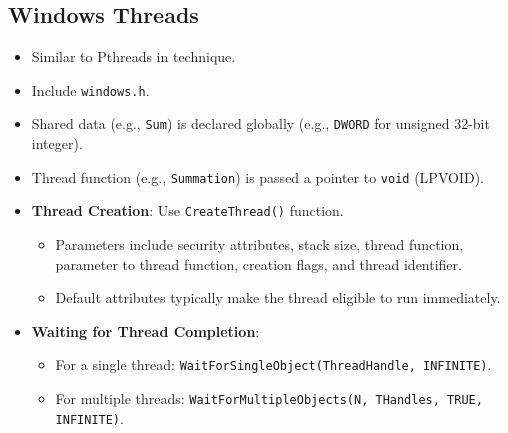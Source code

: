 \subsection{Windows Threads}
\begin{itemize}
    \item Similar to Pthreads in technique.
    \item Include \texttt{windows.h}.
    \item Shared data (e.g., \texttt{Sum}) is declared globally (e.g., \texttt{DWORD} for unsigned 32-bit integer).
    \item Thread function (e.g., \texttt{Summation}) is passed a pointer to \texttt{void} (LPVOID).
    \item \textbf{Thread Creation}: Use \texttt{CreateThread()} function.
        \begin{itemize}
            \item Parameters include security attributes, stack size, thread function, parameter to thread function, creation flags, and thread identifier.
            \item Default attributes typically make the thread eligible to run immediately.
        \end{itemize}
    \item \textbf{Waiting for Thread Completion}:
        \begin{itemize}
            \item For a single thread: \texttt{WaitForSingleObject(ThreadHandle, INFINITE)}.
            \item For multiple threads: \texttt{WaitForMultipleObjects(N, THandles, TRUE, INFINITE)}.
        \end{itemize}
\end{itemize}

